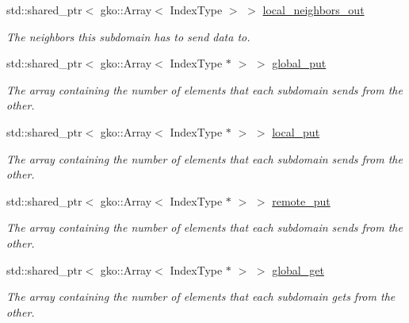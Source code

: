 \begin{DoxyCompactItemize}
\mbox{\label{structSchwarzWrappers_1_1Communicate_1_1comm__struct_a4e13e9ce4207186c4b75a570760b51f9}} 
std\+::shared\+\_\+ptr$<$ gko\+::\+Array$<$ Index\+Type $>$ $>$ \hyperlink{structSchwarzWrappers_1_1Communicate_1_1comm__struct_a4e13e9ce4207186c4b75a570760b51f9}{local\+\_\+neighbors\+\_\+out}
\begin{DoxyCompactList}\small\item\em The neighbors this subdomain has to send data to. \end{DoxyCompactList}\item 
std\+::shared\+\_\+ptr$<$ gko\+::\+Array$<$ Index\+Type $\ast$ $>$ $>$ \hyperlink{structSchwarzWrappers_1_1Communicate_1_1comm__struct_a406f1f74a5a55deed3f6eb1a4ee21ac0}{global\+\_\+put}
\begin{DoxyCompactList}\small\item\em The array containing the number of elements that each subdomain sends from the other. \end{DoxyCompactList}\item 
std\+::shared\+\_\+ptr$<$ gko\+::\+Array$<$ Index\+Type $\ast$ $>$ $>$ \hyperlink{structSchwarzWrappers_1_1Communicate_1_1comm__struct_aa42423af5a04fe17296cdf982a946615}{local\+\_\+put}
\begin{DoxyCompactList}\small\item\em The array containing the number of elements that each subdomain sends from the other. \end{DoxyCompactList}\item 
std\+::shared\+\_\+ptr$<$ gko\+::\+Array$<$ Index\+Type $\ast$ $>$ $>$ \hyperlink{structSchwarzWrappers_1_1Communicate_1_1comm__struct_a6059941b0959c17b4264ba0cc7690c4d}{remote\+\_\+put}
\begin{DoxyCompactList}\small\item\em The array containing the number of elements that each subdomain sends from the other. \end{DoxyCompactList}\item 
std\+::shared\+\_\+ptr$<$ gko\+::\+Array$<$ Index\+Type $\ast$ $>$ $>$ \hyperlink{structSchwarzWrappers_1_1Communicate_1_1comm__struct_a400123c78e4206aadf2eb22825251790}{global\+\_\+get}
\begin{DoxyCompactList}\small\item\em The array containing the number of elements that each subdomain gets from the other. \end{DoxyCompactList}\item 

\end{DoxyCompactItemize}

